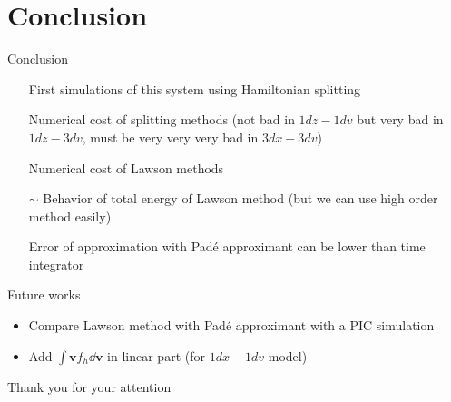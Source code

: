 \documentclass{beamer}
\newcommand{\cmark}{{\color{dgreen}\ding{52}}}
\newcommand{\xmark}{{\color{red}\ding{55}}}
\newcommand{\bmark}{{\color{orange}$\sim$}}
\newcommand{\Mvb}[1]{\boldsymbol{#1}}
\newcommand{\backupbegin}{
  \newcounter{finalframe}
  \setcounter{finalframe}{\value{framenumber}}
}
\begin{document}
\section{Conclusion}
\begin{frame}{Conclusion}
  \begin{enumerate}
    \item[\cmark] First simulations of this system using Hamiltonian splitting
    \item[\xmark] Numerical cost of splitting methods (not bad in $1dz-1dv$ but very bad in $1dz-3dv$, must be very very very bad in $3dx-3dv$)
     \item[\cmark] Numerical cost of Lawson methods
     \item[\bmark] Behavior of total energy of Lawson method (but we can use high order method easily)
     \item[\cmark] Error of approximation with Padé approximant can be lower than time integrator
  \end{enumerate}
\end{frame}
\begin{frame}{Future works}
  \begin{itemize}
    \item Compare Lawson method with Padé approximant with a PIC simulation
    \item Add $\int \Mvb{v}f_h\dd{\Mvb{v}}$ in linear part (for $1dx-1dv$ model)
  \end{itemize}
\end{frame}

\begin{frame}[t]
  \vfill
  { Thank you for your attention}
  \vfill
\end{frame}

\appendix
\backupbegin
\end{document}
